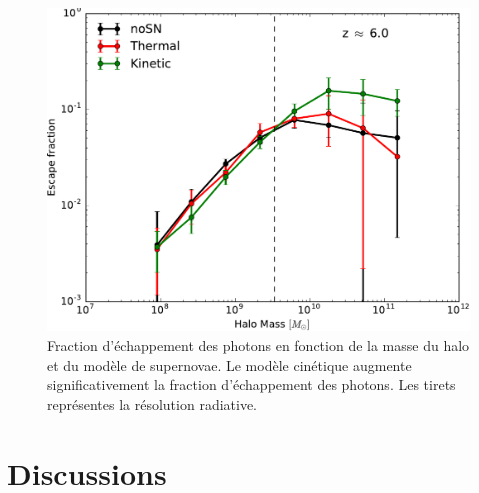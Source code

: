 \begin{figure}
	\centering
	\includegraphics[width=.95\linewidth]{img/03/fesc.pdf} 
    \caption[Fraction d'échappement des photons]{Fraction d'échappement des photons en fonction de la masse du halo et du modèle de supernovae.
    Le modèle cinétique augmente significativement la fraction d'échappement des photons.
    Les tirets représentes la résolution radiative.
 	\label{fig:fesc}}
\end{figure}


\section{Discussions}


